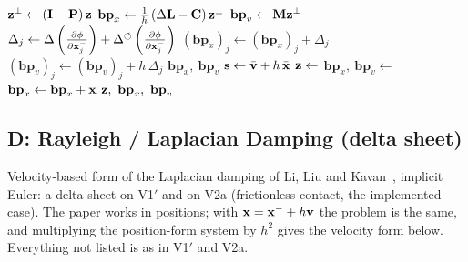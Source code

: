 \begin{algorithm}[H]
\caption{V2a: one back-step, with \textsc{Backprop} adding the corrections per contact (\textsc{Backward} as in Alg.~\ref{alg:npd_v1_backward}).}
\label{alg:npd_v2a_backstep}
\begin{algorithmic}[1]
    \State $\mathbf{z}^\perp \gets \left(\mathbf{I} - \mathbf{P}\right)\mathbf{z}$
    \State $\mathbf{bp}_x \gets \tfrac{1}{h}\left(\Delta\mathbf{L} - \mathbf{C}\right)\mathbf{z}^\perp$
    \State $\mathbf{bp}_v \gets \mathbf{M}\mathbf{z}^\perp$ 
        \State $\Delta_j \gets \Delta\left(\frac{\partial \phi}{\partial \mathbf{x}_j^-}\right) + \Delta^\circlearrowleft\left(\frac{\partial \phi}{\partial \mathbf{x}_j^-}\right)$ 
        \State $\left(\mathbf{bp}_x\right)_j \gets \left(\mathbf{bp}_x\right)_j + \Delta_j$
        \State $\left(\mathbf{bp}_v\right)_j \gets \left(\mathbf{bp}_v\right)_j + h\,\Delta_j$
    \EndFor
    \State \Return $\mathbf{bp}_x,\ \mathbf{bp}_v$
\EndFunction
\Statex
{}
    \State $\mathbf{s} \gets \bar{\mathbf{v}} + h\,\bar{\mathbf{x}}$ 
    \State $\mathbf{z} \gets$  
    \State $\mathbf{bp}_x,\ \mathbf{bp}_v \gets$ 
    \State $\mathbf{bp}_x \gets \mathbf{bp}_x + \bar{\mathbf{x}}$ 
    \State \Return $\z,\ \mathbf{bp}_x,\ \mathbf{bp}_v$
\EndFunction
\end{algorithmic}
\end{algorithm}

\subsection{D: Rayleigh / Laplacian Damping (delta sheet)}
\label{sec:npd_damping}

\noindent Velocity-based form of the Laplacian damping of Li, Liu and Kavan~\cite{li2018laplacian}, implicit Euler: a delta sheet on V1$'$ and on V2a (frictionless contact, the implemented case). The paper works in positions; with $\mathbf{x} = \mathbf{x}^- + h\mathbf{v}$ the problem is the same, and multiplying the position-form system by $h^2$ gives the velocity form below. Everything not listed is as in V1$'$ and V2a.

